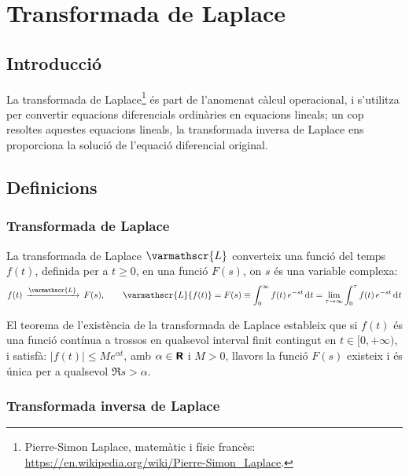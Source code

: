 
\chapter{Transformada de Laplace}\label{sec:ch-laplace}

\section{Introducció}
La transformada de Laplace\footnote{Pierre-Simon Laplace, matemàtic i físic francès: \href{https://en.wikipedia.org/wiki/Pierre-Simon_Laplace}{https:/\!\!/en.wikipedia.org/wiki/Pierre-Simon\_Laplace}.} és part de l'anomenat càlcul operacional,
i s'utilitza per convertir equacions diferencials ordinàries en
equacions lineals; un cop resoltes aquestes equacions lineals, la
transformada inversa de Laplace ens proporciona la solució de
l'equació diferencial original.

\section{Definicions}

\subsection{Transformada de Laplace}

La transformada de Laplace $\varmathscr{L}$  converteix una funció del
temps $f(t)$, definida per a $t\geq 0$, en una funció $F(s)$, on $s$
és una variable complexa:
\begin{equation}
	f(t)\,\xrightarrow{\varmathscr{L}}\,F(s), \qquad
    \varmathscr{L}\{f(t)\} = F(s) \equiv \int_0^\infty f(t) \,e^{-s t} \diff t =
    \lim_{\tau\to\infty} \int_0^\tau f(t) \,e^{-s t} \diff t \label{eq:transf_laplace}
\end{equation}

El teorema de l'existència de la transformada de Laplace estableix
que si $f(t)$ és una funció contínua a trossos en qualsevol
interval finit contingut en $t \in [0,+\infty)$, i satisfà: $|f(t)| \leq M
e^{\alpha t}$, amb $\alpha \in {\ensuremath{\boldsymbol{\mathsf{R}}}}$ i $M > 0$,  llavors la
funció $F(s)$ existeix i és única per a
qualsevol $\Re s > \alpha$.

\subsection{Transformada inversa de Laplace}

